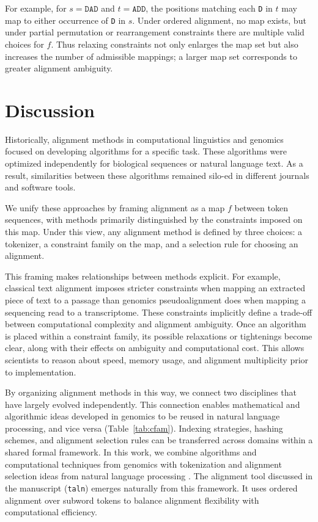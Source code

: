 For example, for $s=\texttt{DAD}$ and $t=\texttt{ADD}$, the positions matching each \texttt{D} in $t$ may map to either occurrence of \texttt{D} in $s$. Under ordered alignment, no map exists, but under partial permutation or rearrangement constraints there are multiple valid choices for $f$. Thus relaxing constraints not only enlarges the map set but also increases the number of admissible mappings; a larger map set corresponds to greater alignment ambiguity.

\section{Discussion}
Historically, alignment methods in computational linguistics and genomics focused on developing algorithms for a specific task. These algorithms were optimized independently for biological sequences or natural language text. As a result, similarities between these algorithms remained silo-ed in different journals and software tools.

We unify these approaches by framing alignment as a map $f$ between token sequences, with methods primarily distinguished by the constraints imposed on this map. Under this view, any alignment method is defined by three choices: a tokenizer, a constraint family on the map, and a selection rule for choosing an alignment.

This framing makes relationships between methods explicit. For example,  classical text alignment imposes stricter constraints when mapping an extracted piece of text to a passage than genomics pseudoalignment does when mapping a sequencing read to a transcriptome. These constraints implicitly define a trade-off between computational complexity and alignment ambiguity. Once an algorithm is placed within a constraint family, its possible relaxations or tightenings become clear, along with their effects on ambiguity and computational cost. This allows scientists to reason about speed, memory usage, and alignment multiplicity prior to implementation.

By organizing alignment methods in this way, we connect two disciplines that have largely evolved independently. This connection enables mathematical and algorithmic ideas developed in genomics to be reused in natural language processing, and vice versa (Table~\ref{tab:cfam}). Indexing strategies, hashing schemes, and alignment selection rules can be transferred across domains within a shared formal framework. In this work, we combine algorithms and computational techniques from genomics \citep{Bray2016kallisto, Melsted2021, Sullivan2025} with tokenization and alignment selection ideas from natural language processing \citep{hirschberg1975lcs,sennrich2016neuralmachinetranslationrare}. The alignment tool discussed in the manuscript (\texttt{taln}) emerges naturally from this framework. It uses ordered alignment over subword tokens to balance alignment flexibility with computational efficiency.


